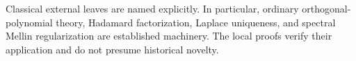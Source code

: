 \documentclass[11pt,oneside,openany]{book}
\begin{document}
Classical external leaves are named explicitly. In particular, ordinary
orthogonal-polynomial theory, Hadamard factorization, Laplace uniqueness,
and spectral Mellin regularization are established machinery. The local
proofs verify their application and do not presume historical novelty.







\end{document}
